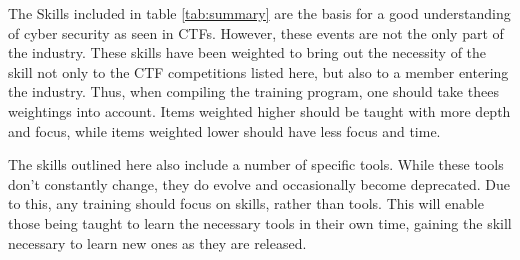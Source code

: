 \documentclass[a4paper,11pt]{report}
\begin{document}
	The Skills included in table \ref{tab:summary} are the basis for a good understanding of cyber security as seen in CTFs. 
	However, these events are not the only part of the industry. 
	These skills have been weighted to bring out the necessity of the skill not only to the CTF competitions listed here, 
	but also to a member entering the industry. 
	Thus, when compiling the training program, one should take thees weightings into account. 
	Items weighted higher should be taught with more depth and focus, while items weighted lower should have less focus and time. 

	The skills outlined here also include a number of specific tools. 
	While these tools don't constantly change, they do evolve and occasionally become deprecated. 
	Due to this, any training should focus on skills, rather than tools. 
	This will enable those being taught to learn the necessary tools in their own time, 
	gaining the skill necessary to learn new ones as they are released. 
\end{document}
